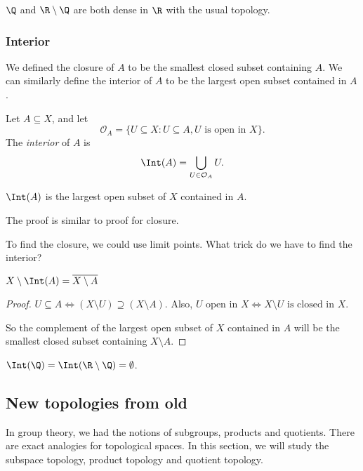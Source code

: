 \documentclass[a4paper]{article}
\begin{document}
\begin{eg}
  $\Q$ and $\R\setminus \Q$ are both dense in $\R$ with the usual topology.
\end{eg}

\subsubsection{Interior}
We defined the closure of $A$ to be the smallest closed subset containing $A$. We can similarly define the interior of $A$ to be the largest open subset contained in $A$.

\begin{defi}[Interior]
  Let $A\subseteq X$, and let
  \[
    \mathcal{O}_A = \{U\subseteq X: U\subseteq A, U\text{ is open in }X\}.
  \]
  The \emph{interior} of $A$ is
  \[
    \Int(A) = \bigcup_{U\in \mathcal{O}_A} U.
  \]
\end{defi}

\begin{prop}
  $\Int(A)$ is the largest open subset of $X$ contained in $A$.
\end{prop}
The proof is similar to proof for closure.

To find the closure, we could use limit points. What trick do we have to find the interior?
\begin{prop}
  $X\setminus \Int(A) = \overline{X\setminus A}$
\end{prop}

\begin{proof}
  $U\subseteq A\Leftrightarrow (X\setminus U)\supseteq (X\setminus A)$. Also, $U\text{ open in }X\Leftrightarrow X\setminus U\text{ is closed in }X$.

  So the complement of the largest open subset of $X$ contained in $A$ will be the smallest closed subset containing $X\setminus A$.
\end{proof}

\begin{eg}
  $\Int(\Q) = \Int(\R\setminus \Q) = \emptyset$.
\end{eg}

\subsection{New topologies from old}
In group theory, we had the notions of subgroups, products and quotients. There are exact analogies for topological spaces. In this section, we will study the subspace topology, product topology and quotient topology.
\end{document}
